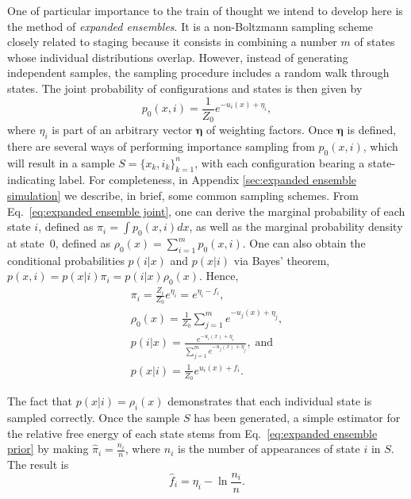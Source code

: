 \documentclass[aip,jcp,reprint,amsmath,amssymb]{revtex4-1}
\newcommand{\vt}[1]{\boldsymbol{\mathbf{#1}}}           %
\begin{document}
One of particular importance to the train of thought we intend to develop here is the method of \textit{expanded ensembles}.\cite{Lyubartsev_1992} It is a non-Boltzmann sampling scheme closely related to staging because it consists in combining a number $m$ of states whose individual distributions overlap. However, instead of generating independent samples, the sampling procedure includes a random walk through states. The joint probability of configurations and states is then given by\cite{Nymeyer_2010}
\begin{equation}
\label{eq:expanded ensemble joint}
p_0(x, i) = \frac{1}{Z_0} e^{-u_i(x) + \eta_i},
\end{equation}
where $\eta_i$ is part of an arbitrary vector $\vt \eta$ of weighting factors. Once $\vt \eta$ is defined, there are several ways of performing importance sampling from $p_0(x,i)$, which will result in a sample $S = \{x_k,i_k\}_{k=1}^n$, with each configuration bearing a state-indicating label. For completeness, in Appendix \ref{sec:expanded ensemble simulation} we describe, in brief, some common sampling schemes. From Eq.~\eqref{eq:expanded ensemble joint}, one can derive the marginal probability of each state $i$, defined as $\pi_i = \int p_0(x,i)dx$, as well as the marginal probability density at state~$0$, defined as $\rho_0(x) = \sum_{i=1}^m p_0(x,i)$. One can also obtain the conditional probabilities $p(i|x)$ and $p(x|i)$ via Bayes' theorem, $p(x,i) = p(x|i) \pi_i = p(i|x) \rho_0(x)$. Hence,
\begin{subequations}
\label{eq:expanded ensemble probabilities}
\begin{gather}
\pi_i = \frac{Z_i}{Z_0} e^{\eta_i} = e^{\eta_i - f_i}, \label{eq:expanded ensemble prior} \\
\rho_0(x) = \frac{1}{Z_0} \sum_{j=1}^m e^{-u_j(x) + \eta_j}, \label{eq:expanded ensemble evidence} \\
p(i|x) = \frac{e^{-u_i(x) + \eta_i}}{\sum_{j=1}^m e^{-u_j(x) + \eta_j}}, \; \text{and} \label{eq:expanded ensemble posterior} \\
p(x|i) = \frac{1}{Z_0} e^{u_i(x) + f_i}. \label{eq:expanded ensemble likelihood}
\end{gather}
\end{subequations}

The fact that $p(x|i) = \rho_i(x)$ demonstrates that each individual state is sampled correctly. Once the sample $S$ has been generated, a simple estimator for the relative free energy of each state stems from Eq.~\eqref{eq:expanded ensemble prior} by making $\hat \pi_i = \frac{n_i}{n}$, where $n_i$ is the number of appearances of state $i$ in $S$. The result is
\begin{equation}
\label{eq:expanded ensemble histogram estimator}
\hat f_i = \eta_i - \ln \frac{n_i}{n}.
\end{equation}
\end{document}
